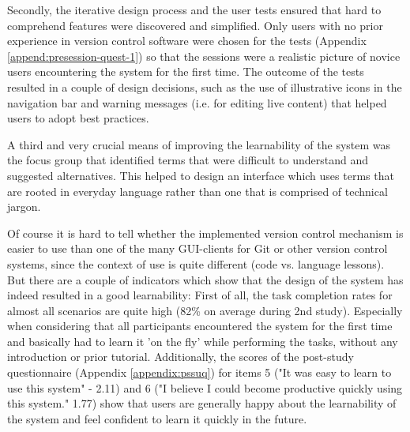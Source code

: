 Secondly, the iterative design process and the user tests ensured that hard to comprehend features were discovered and simplified. Only users with no prior experience in version control software were chosen for the tests (Appendix \ref{append:presession-quest-1}) so that the sessions were a realistic picture of novice users encountering the system for the first time. The outcome of the tests resulted in a couple of design decisions, such as the use of illustrative icons in the navigation bar and warning messages (i.e. for editing live content) that helped users to adopt best practices.

A third and very crucial means of improving the learnability of the system was the focus group that identified terms that were difficult to understand and suggested alternatives. This helped to design an interface which uses terms that are rooted in everyday language rather than one that is comprised of technical jargon.

Of course it is hard to tell whether the implemented version control mechanism is easier to use than one of the many GUI-clients for Git or other version control systems, since the context of use is quite different (code vs. language lessons). But there are a couple of indicators which show that the design of the system has indeed resulted in a good learnability: First of all, the task completion rates for almost all scenarios are quite high (82\% on average during 2nd study). Especially when considering that all participants encountered the system for the first time and basically had to learn it 'on the fly' while performing the tasks, without any introduction or prior tutorial. Additionally, the scores of the post-study questionnaire (Appendix \ref{appendix:pssuq}) for items 5 ("It was easy to learn to use this system" - 2.11) and 6 ("I believe I could become productive quickly using this system." 1.77) show that users are generally happy about the learnability of the system and feel confident to learn it quickly in the future.



